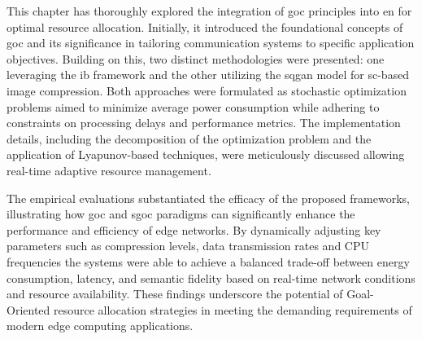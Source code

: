 This chapter has thoroughly explored the integration of \gls{goc} principles into \gls{en} for optimal resource allocation. Initially, it introduced the foundational concepts of \gls{goc} and its significance in tailoring communication systems to specific application objectives. Building on this, two distinct methodologies were presented: one leveraging the \gls{ib} framework and the other utilizing the \gls{sqgan} model for \gls{sc}-based image compression. Both approaches were formulated as stochastic optimization problems aimed to minimize average power consumption while adhering to constraints on processing delays and performance metrics. The implementation details, including the decomposition of the optimization problem and the application of Lyapunov-based techniques, were meticulously discussed allowing real-time adaptive resource management.

The empirical evaluations substantiated the efficacy of the proposed frameworks, illustrating how \gls{goc} and \gls{sgoc} paradigms can significantly enhance the performance and efficiency of edge networks. By dynamically adjusting key parameters such as compression levels, data transmission rates and CPU frequencies the systems were able to achieve a balanced trade-off between energy consumption, latency, and semantic fidelity based on real-time network conditions and resource availability. These findings underscore the potential of Goal-Oriented resource allocation strategies in meeting the demanding requirements of modern edge computing applications.
